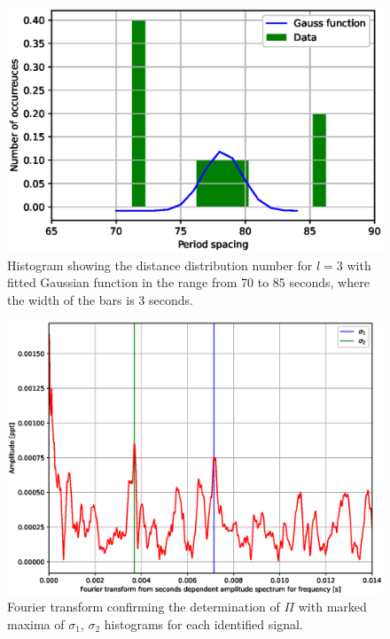 \documentclass{aa}
\begin{document}
\begin{figure}
    \centering
    \includegraphics[scale=1]{images/histogram_l3_gauss.eps}
    \caption{Histogram showing the distance distribution number for $ l = 3$  with fitted Gaussian function in the range from 70 to 85 seconds, where the width of the bars is 3 seconds.}
    \label{fig:my_label_11}
\end{figure}

\begin{figure}[h]
    \centering
    \includegraphics[scale=0.65]{images/2nd_ft.eps}
    \caption{Fourier transform confirming the determination of $ \Pi $ with marked maxima of $ \sigma_1 $, $ \sigma_2 $ histograms for each identified signal.}
    \label{fig:my_label_8}
\end{figure}
\end{document}
